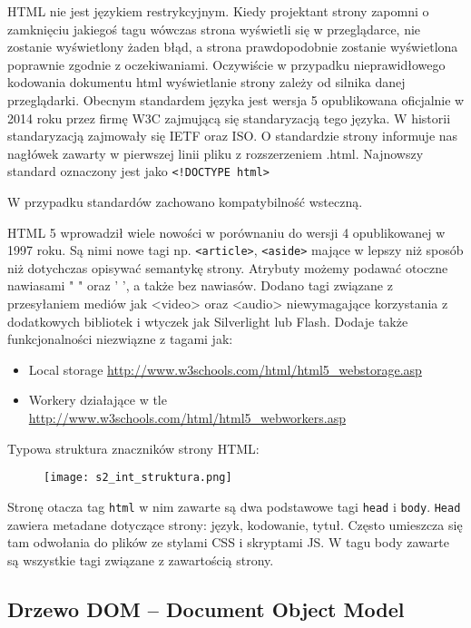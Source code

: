 HTML nie jest językiem restrykcyjnym. Kiedy projektant strony zapomni o zamknięciu jakiegoś tagu wówczas strona wyświetli się w przeglądarce, nie zostanie wyświetlony żaden błąd, a strona prawdopodobnie zostanie wyświetlona poprawnie zgodnie z oczekiwaniami. Oczywiście w przypadku nieprawidłowego kodowania dokumentu html wyświetlanie strony zależy od silnika danej przeglądarki. Obecnym standardem języka jest wersja 5 opublikowana oficjalnie w 2014 roku przez firmę W3C zajmującą się standaryzacją tego języka. W historii standaryzacją zajmowały się IETF oraz ISO. O standardzie strony informuje nas nagłówek zawarty w pierwszej linii pliku z rozszerzeniem .html. Najnowszy standard oznaczony jest jako \texttt{<!DOCTYPE html>}

W przypadku standardów zachowano kompatybilność wsteczną.

HTML 5 wprowadził wiele nowości w porównaniu do wersji 4 opublikowanej w 1997 roku. Są nimi nowe tagi np. \texttt{<article>}, \texttt{<aside>} mające w lepszy niż sposób niż dotychczas opisywać semantykę strony. Atrybuty możemy podawać otoczne nawiasami " " oraz ' ', a także bez nawiasów. Dodano tagi związane z przesyłaniem mediów jak <video> oraz <audio> niewymagające korzystania z dodatkowych bibliotek i wtyczek jak Silverlight lub Flash. Dodaje także funkcjonalności niezwiązne z tagami jak:
\begin{itemize}
\item Local storage \url{http://www.w3schools.com/html/html5_webstorage.asp}
\item Workery działające w tle \url{http://www.w3schools.com/html/html5_webworkers.asp}
\end{itemize}

Typowa struktura znaczników strony HTML:

\begin{figure}[H]
\centering
\texttt{[image: s2\_int\_struktura.png]}
\end{figure}

Stronę otacza tag \texttt{html} w nim zawarte są dwa podstawowe tagi \texttt{head} i \texttt{body}. \texttt{Head} zawiera metadane dotyczące strony: język, kodowanie, tytuł. Często umieszcza się tam odwołania do plików ze stylami CSS i skryptami JS. W tagu body zawarte są wszystkie tagi związane z zawartością strony.

\subsection{Drzewo DOM -- Document Object Model}

